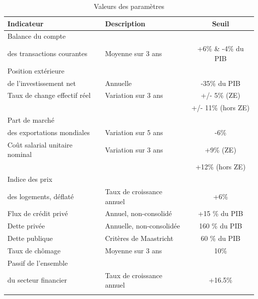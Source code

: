 \documentclass{article}\usepackage[]{graphicx}\usepackage[]{color}
\begin{document}
\vspace*{\fill}

\begin{table}
\begin{center}
\caption{Valeurs des paramètres}
\begin{tabular}{llc}
\hline
Indicateur & Description & Seuil\\
\hline
Balance du compte & & \\ des transactions courantes & Moyenne sur 3 ans & +6\% \& -4\% du PIB \\
Position extérieure & & \\ de l'investissement net & Annuelle & -35\% du PIB\\
Taux de change effectif réel & Variation sur 3 ans & +/- 5\% (ZE) \\
& & +/- 11\% (hors ZE) \\
Part de marché & & \\ des exportations mondiales & Variation sur 5 ans & -6\% \\
Coût salarial unitaire nominal & Variation sur 3 ans & +9\% (ZE) \\
& & +12\% (hors ZE) \\
Indice des prix & & \\ des logements, déflaté & Taux de croissance annuel & +6\%\\
Flux de crédit privé & Annuel, non-consolidé & +15 \% du PIB \\
Dette privée & Annuelle, non-consolidée & 160 \% du PIB \\
Dette publique & Critères de Maastricht & 60 \% du PIB \\
Taux de chômage & Moyenne sur 3 ans & 10\% \\
Passif de l'ensemble & & \\ du secteur financier & Taux de croissance annuel & +16.5\%\\
\hline
\label{tab:paramval}
\end{tabular}
\end{center}
\end{table}

\clearpage
\end{document}
